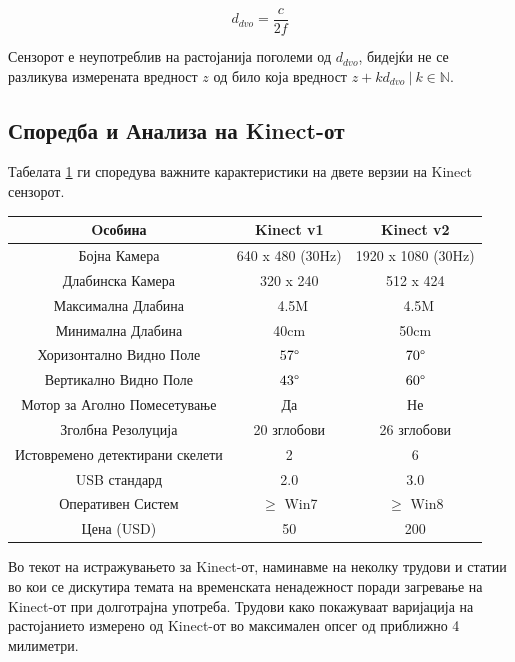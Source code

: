 \documentclass[12pt]{article}
\begin{document}
		$$ d_{dvo} = \frac{c}{2f} $$

		Сензорот е неупотреблив на растојанија поголеми од $d_{dvo}$, бидејќи не се разликува измерената вредност $z$ од било која вредност $z + k d_{dvo}\ | \ k \in \mathbb{N}$.

  \subsection{Споредба и Анализа на Kinect-от}
    Табелата \ref{tab:comparison} ги споредува важните карактеристики на двете верзии на Kinect сензорот.
    \begin{table}[H]
      \centering
      \label{tab:comparison}
      \begin{tabular}{||c|c|c||}
        \hline
        \textbf{Oсобина} & \textbf{Kinect v1} & \textbf{Kinect v2} \\
        \hline
        Бојна Камера & 640 x 480 (30Hz) & 1920 x 1080 (30Hz) \\
        \hline
        Длабинска Камера & 320 x 240 & 512 x 424 \\
        \hline
        Максимална Длабина & ~4.5M & ~4.5M \\
        \hline
        Минимална Длабина & 40cm & 50cm \\
        \hline
        Хоризонтално Видно Поле & $57\degree$ & $70\degree$ \\
        \hline
        Вертикално Видно Поле & $43\degree$ & $60\degree$ \\
        \hline
        Мотор за Аголно Помесетување & Да & Не \\
        \hline
        Зголбна Резолуција & 20 зглобови & 26 зглобови \\
        \hline
        Истовремено детектирани скелети &  2 & 6 \\
        \hline
        USB стандард & 2.0 & 3.0 \\
        \hline
        Оперативен Систем & $\geq$ Win7 & $\geq$ Win8 \\
        \hline
        Цена (USD) & 50 & 200 \\
        \hline
      \end{tabular}
      \end{table}

    Во текот на истражувањето за Kinect-от, наминавме на неколку трудови и статии во кои се дискутира темата на временската ненадежност поради загревање на Kinect-от при долготрајна употреба. Трудови како \cite{heatup} покажуваат варијација на растојанието измерено од Kinect-от во максимален опсег од приближно 4 милиметри.
\end{document}
